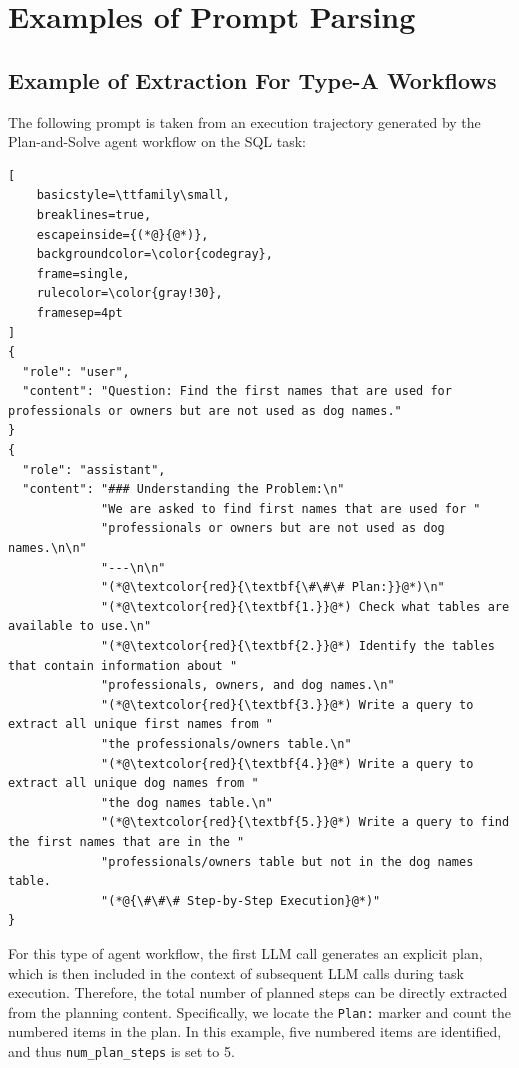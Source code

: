 \clearpage

\section{Examples of Prompt Parsing}
\label{prompt_parser}

\subsection{Example of Extraction For Type-A Workflows}

The following prompt is taken from an execution trajectory generated by the Plan-and-Solve agent workflow on the SQL task:

\begin{lstlisting}[
    basicstyle=\ttfamily\small,
    breaklines=true,
    escapeinside={(*@}{@*)},
    backgroundcolor=\color{codegray},
    frame=single,
    rulecolor=\color{gray!30},
    framesep=4pt
]
{
  "role": "user",
  "content": "Question: Find the first names that are used for professionals or owners but are not used as dog names."
}
{
  "role": "assistant",
  "content": "### Understanding the Problem:\n"
             "We are asked to find first names that are used for "
             "professionals or owners but are not used as dog names.\n\n"
             "---\n\n"
             "(*@\textcolor{red}{\textbf{\#\#\# Plan:}}@*)\n"
             "(*@\textcolor{red}{\textbf{1.}}@*) Check what tables are available to use.\n"
             "(*@\textcolor{red}{\textbf{2.}}@*) Identify the tables that contain information about "
             "professionals, owners, and dog names.\n"
             "(*@\textcolor{red}{\textbf{3.}}@*) Write a query to extract all unique first names from "
             "the professionals/owners table.\n"
             "(*@\textcolor{red}{\textbf{4.}}@*) Write a query to extract all unique dog names from "
             "the dog names table.\n"
             "(*@\textcolor{red}{\textbf{5.}}@*) Write a query to find the first names that are in the "
             "professionals/owners table but not in the dog names table.
             "(*@{\#\#\# Step-by-Step Execution}@*)"
}
\end{lstlisting}

For this type of agent workflow, the first LLM call generates an explicit plan, which is then included in the context of subsequent LLM calls during task execution. Therefore, the total number of planned steps can be directly extracted from the planning content. Specifically, we locate the \texttt{Plan:} marker and count the numbered items in the plan. In this example, five numbered items are identified, and thus \texttt{num\_plan\_steps} is set to 5.

